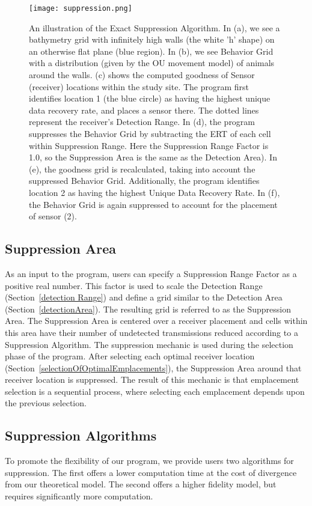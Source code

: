 \begin{figure}[t]
	\label{suppressionImage}
	\centering
	\texttt{[image: suppression.png]}
	\caption{An illustration of the Exact Suppression Algorithm.  In (a), we see a bathymetry grid with infinitely high walls (the white 'h' shape) on an otherwise flat plane (blue region).  In (b), we see Behavior Grid with a distribution (given by the OU movement model) of animals around the walls.  (c) shows the computed goodness of Sensor (receiver) locations within the study site.  The program first identifies location 1 (the blue circle) as having the highest unique data recovery rate, and places a sensor there.  The dotted lines represent the receiver's Detection Range.  In (d), the program suppresses the Behavior Grid by subtracting the ERT of each cell within Suppression Range.  Here the Suppression Range Factor is 1.0, so the Suppression Area is the same as the Detection Area).  In (e), the goodness grid is recalculated, taking into account the suppressed Behavior Grid.  Additionally, the program identifies location 2 as having the highest Unique Data Recovery Rate.  In (f), the Behavior Grid is again suppressed to account for the placement of sensor (2).}
\end{figure}

\subsection{Suppression Area}
As an input to the program, users can specify a Suppression Range Factor as a positive real number.  This factor is used to scale the Detection Range (Section~\ref{detection Range}) and define a grid similar to the Detection Area (Section~\ref{detectionArea}).  The resulting grid is referred to as the Suppression Area.  The Suppression Area is centered over a receiver placement and cells within this area have their number of undetected transmissions reduced according to a Suppression Algorithm.  The suppression mechanic is used during the selection phase of the program.  After selecting each optimal receiver location (Section~\ref{selectionOfOptimalEmplacements}), the Suppression Area around that receiver location is suppressed.  The result of this mechanic is that emplacement selection is a sequential process, where selecting each emplacement depends upon the previous selection.  

\subsection{Suppression Algorithms}
\label{suppressionAlgorithms}
To promote the flexibility of our program, we provide users two algorithms for suppression.  The first offers a lower computation time at the cost of divergence from our theoretical model.  The second offers a higher fidelity model, but requires significantly more computation.

